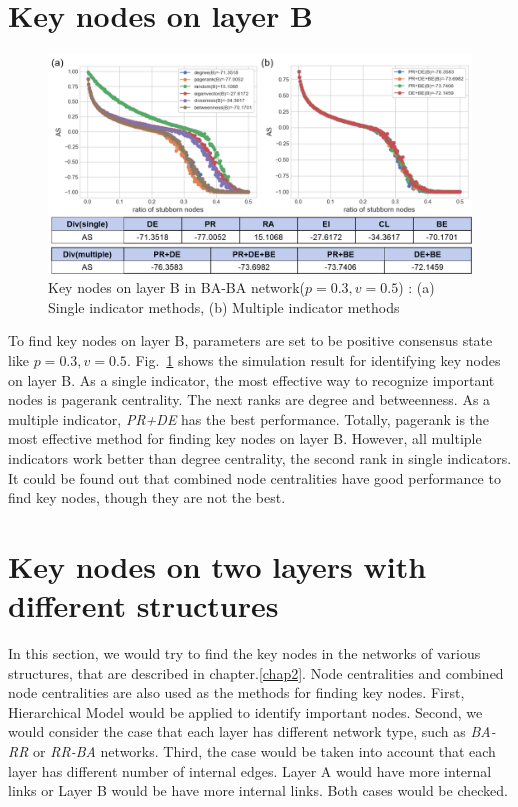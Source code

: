 \section{Key nodes on layer B}
\begin{figure}[!htb]
	\centering
	\includegraphics[width=\hsize]{figure/chap5_keynode_B.png}
	\caption{Key nodes on layer B in BA-BA network($p=0.3, v=0.5$) : (a) Single indicator methods, (b) Multiple indicator methods}
	\label{chap5_keynode_B}
\end{figure}

To find key nodes on layer B, parameters are set to be positive consensus state like $p=0.3, v=0.5$. Fig.~\ref{chap5_keynode_B} shows the simulation result for identifying key nodes on layer B. As a single indicator, the most effective way to recognize important nodes is pagerank centrality. The next ranks are degree and betweenness. As a multiple indicator, \textit{PR+DE} has the best performance. Totally, pagerank is the most effective method for finding key nodes on layer B. However, all multiple indicators work better than degree centrality, the second rank in single indicators. It could be found out that combined node centralities have good performance to find key nodes, though they are not the best. 

\section{Key nodes on two layers with different structures}
In this section, we would try to find the key nodes in the networks of various structures, that are described in chapter.\ref{chap2}. Node centralities and combined node centralities are also used as the methods for finding key nodes. First, Hierarchical Model would be applied to identify important nodes. Second, we would consider the case that each layer has different network type, such as \textit{BA-RR} or \textit{RR-BA} networks. Third, the case would be taken into account that each layer has different number of internal edges. Layer A would have more internal links or Layer B would be have more internal links. Both cases would be checked. 

